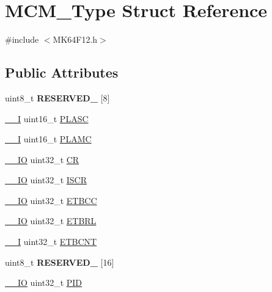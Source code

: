\hypertarget{structMCM__Type}{}\section{M\+C\+M\+\_\+\+Type Struct Reference}
\label{structMCM__Type}


{\ttfamily \#include $<$M\+K64\+F12.\+h$>$}

\subsection*{Public Attributes}
\begin{DoxyCompactItemize}
\item 
uint8\+\_\+t {\bfseries R\+E\+S\+E\+R\+V\+E\+D\+\_} \mbox{[}8\mbox{]}\hypertarget{structMCM__Type_a1b173a3e4a487bc03e3d04c986dc7968}{}\label{structMCM__Type_a1b173a3e4a487bc03e3d04c986dc7968}

\item 
\hyperlink{core__sc300_8h_af63697ed9952cc71e1225efe205f6cd3}{\+\_\+\+\_\+I} uint16\+\_\+t \hyperlink{structMCM__Type_a7e83a4220c2fc40542aa700b6a98df41}{P\+L\+A\+SC}
\item 
\hyperlink{core__sc300_8h_af63697ed9952cc71e1225efe205f6cd3}{\+\_\+\+\_\+I} uint16\+\_\+t \hyperlink{structMCM__Type_a21b4db9fd3a7335e135c8bf0be800b92}{P\+L\+A\+MC}
\item 
\hyperlink{core__sc300_8h_aec43007d9998a0a0e01faede4133d6be}{\+\_\+\+\_\+\+IO} uint32\+\_\+t \hyperlink{structMCM__Type_ac703b93883db7ce06bb9a6b6222a7e6f}{CR}
\item 
\hyperlink{core__sc300_8h_aec43007d9998a0a0e01faede4133d6be}{\+\_\+\+\_\+\+IO} uint32\+\_\+t \hyperlink{structMCM__Type_ad05a8c7768c98a628dc1f659deba7d5c}{I\+S\+CR}
\item 
\hyperlink{core__sc300_8h_aec43007d9998a0a0e01faede4133d6be}{\+\_\+\+\_\+\+IO} uint32\+\_\+t \hyperlink{structMCM__Type_a7e5af94b540eca88f8332c0eae3b11dd}{E\+T\+B\+CC}
\item 
\hyperlink{core__sc300_8h_aec43007d9998a0a0e01faede4133d6be}{\+\_\+\+\_\+\+IO} uint32\+\_\+t \hyperlink{structMCM__Type_a67931589db87c44b6387d38d78a7268e}{E\+T\+B\+RL}
\item 
\hyperlink{core__sc300_8h_af63697ed9952cc71e1225efe205f6cd3}{\+\_\+\+\_\+I} uint32\+\_\+t \hyperlink{structMCM__Type_a130dd2c21ea8fd8a4e3e3acc41629ff4}{E\+T\+B\+C\+NT}
\item 
uint8\+\_\+t {\bfseries R\+E\+S\+E\+R\+V\+E\+D\+\_} \mbox{[}16\mbox{]}\hypertarget{structMCM__Type_a910a7f8c552291635245f86fe1a5cfee}{}\label{structMCM__Type_a910a7f8c552291635245f86fe1a5cfee}

\item 
\hyperlink{core__sc300_8h_aec43007d9998a0a0e01faede4133d6be}{\+\_\+\+\_\+\+IO} uint32\+\_\+t \hyperlink{structMCM__Type_ad3902a699f1593becfab73adbd8e506a}{P\+ID}
\end{DoxyCompactItemize}


